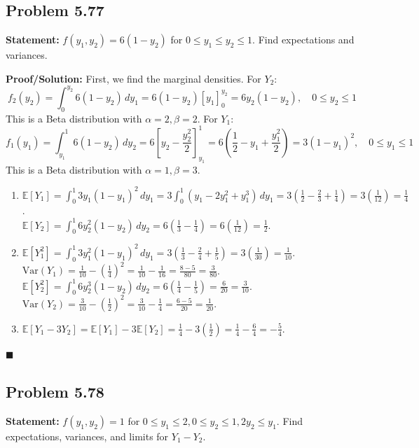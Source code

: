 \documentclass[11pt, a4paper]{article}
\theoremstyle{definition}
\theoremstyle{remark}
\newcommand{\E}{\mathbb{E}}
\newcommand{\Var}{\mathrm{Var}}
\begin{document}
\subsection{Problem 5.77}
\textbf{Statement:} $f(y_1, y_2) = 6(1 - y_2)$ for $0 \leq y_1 \leq y_2 \leq 1$. Find expectations and variances.

\textbf{Proof/Solution:}
First, we find the marginal densities.
For $Y_2$:
\[
f_2(y_2) = \int_0^{y_2} 6(1 - y_2) \, dy_1 = 6(1 - y_2)[y_1]_0^{y_2} = 6y_2(1 - y_2), \quad 0 \leq y_2 \leq 1
\]
This is a Beta distribution with $\alpha=2, \beta=2$.
For $Y_1$:
\[
f_1(y_1) = \int_{y_1}^1 6(1 - y_2) \, dy_2 = 6 \left[ y_2 - \frac{y_2^2}{2} \right]_{y_1}^1 = 6 \left( \frac{1}{2} - y_1 + \frac{y_1^2}{2} \right) = 3(1 - y_1)^2, \quad 0 \leq y_1 \leq 1
\]
This is a Beta distribution with $\alpha=1, \beta=3$.
\begin{enumerate}[label=\alph*)]
    \item $\E[Y_1] = \int_0^1 3y_1(1-y_1)^2 \, dy_1 = 3 \int_0^1 (y_1 - 2y_1^2 + y_1^3) \, dy_1 = 3\left(\frac{1}{2} - \frac{2}{3} + \frac{1}{4}\right) = 3\left(\frac{1}{12}\right) = \frac{1}{4}$. \\ \relax
    $\E[Y_2] = \int_0^1 6y_2^2(1-y_2) \, dy_2 = 6\left(\frac{1}{3} - \frac{1}{4}\right) = 6\left(\frac{1}{12}\right) = \frac{1}{2}$.
    \item $\E[Y_1^2] = \int_0^1 3y_1^2(1-y_1)^2 \, dy_1 = 3\left(\frac{1}{3} - \frac{2}{4} + \frac{1}{5}\right) = 3\left(\frac{1}{30}\right) = \frac{1}{10}$. \\ \relax
    $\Var(Y_1) = \frac{1}{10} - \left(\frac{1}{4}\right)^2 = \frac{1}{10} - \frac{1}{16} = \frac{8 - 5}{80} = \frac{3}{80}$. \\ \relax
    $\E[Y_2^2] = \int_0^1 6y_2^3(1-y_2) \, dy_2 = 6\left(\frac{1}{4} - \frac{1}{5}\right) = \frac{6}{20} = \frac{3}{10}$. \\ \relax
    $\Var(Y_2) = \frac{3}{10} - \left(\frac{1}{2}\right)^2 = \frac{3}{10} - \frac{1}{4} = \frac{6 - 5}{20} = \frac{1}{20}$.
    \item $\E[Y_1 - 3Y_2] = \E[Y_1] - 3\E[Y_2] = \frac{1}{4} - 3\left(\frac{1}{2}\right) = \frac{1}{4} - \frac{6}{4} = -\frac{5}{4}$.
\end{enumerate}
\hfill $\blacksquare$

\subsection{Problem 5.78}
\textbf{Statement:} $f(y_1, y_2) = 1$ for $0 \leq y_1 \leq 2, 0 \leq y_2 \leq 1, 2y_2 \leq y_1$. Find expectations, variances, and limits for $Y_1 - Y_2$.
\end{document}
